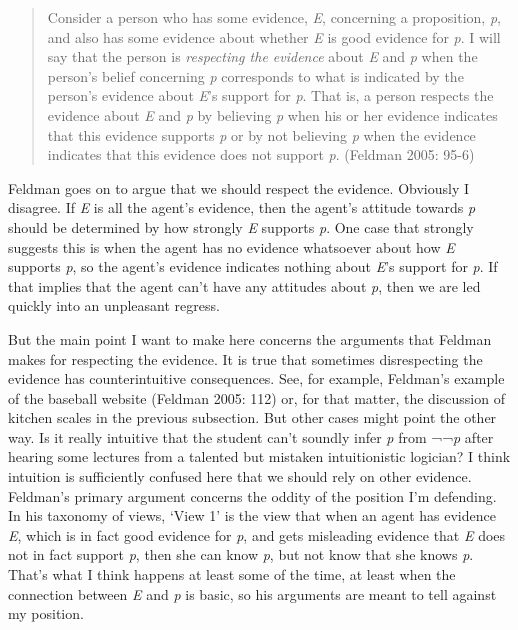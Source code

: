 \documentclass[
  11pt,
  letterpaper,
  DIV=11,
  numbers=noendperiod,
  twoside]{scrartcl}
\begin{document}
\begin{quote}
Consider a person who has some evidence, \emph{E}, concerning a
proposition, \emph{p}, and also has some evidence about whether \emph{E}
is good evidence for \emph{p}. I will say that the person is
\emph{respecting the evidence} about \emph{E} and \emph{p} when the
person's belief concerning \emph{p} corresponds to what is indicated by
the person's evidence about \emph{E}'s support for \emph{p}. That is, a
person respects the evidence about \emph{E} and \emph{p} by believing
\emph{p} when his or her evidence indicates that this evidence supports
\emph{p} or by not believing \emph{p} when the evidence indicates that
this evidence does not support \emph{p}. (Feldman 2005: 95-6)
\end{quote}

Feldman goes on to argue that we should respect the evidence. Obviously
I disagree. If \emph{E} is all the agent's evidence, then the agent's
attitude towards \emph{p} should be determined by how strongly \emph{E}
supports \emph{p}. One case that strongly suggests this is when the
agent has no evidence whatsoever about how \emph{E} supports \emph{p},
so the agent's evidence indicates nothing about \emph{E}'s support for
\emph{p}. If that implies that the agent can't have any attitudes about
\emph{p}, then we are led quickly into an unpleasant regress.

But the main point I want to make here concerns the arguments that
Feldman makes for respecting the evidence. It is true that sometimes
disrespecting the evidence has counterintuitive consequences. See, for
example, Feldman's example of the baseball website (Feldman 2005: 112)
or, for that matter, the discussion of kitchen scales in the previous
subsection. But other cases might point the other way. Is it really
intuitive that the student can't soundly infer \emph{p} from ¬¬\emph{p}
after hearing some lectures from a talented but mistaken intuitionistic
logician? I think intuition is sufficiently confused here that we should
rely on other evidence. Feldman's primary argument concerns the oddity
of the position I'm defending. In his taxonomy of views, `View 1' is the
view that when an agent has evidence \emph{E}, which is in fact good
evidence for \emph{p}, and gets misleading evidence that \emph{E} does
not in fact support \emph{p}, then she can know \emph{p}, but not know
that she knows \emph{p}. That's what I think happens at least some of
the time, at least when the connection between \emph{E} and \emph{p} is
basic, so his arguments are meant to tell against my position.
\end{document}
